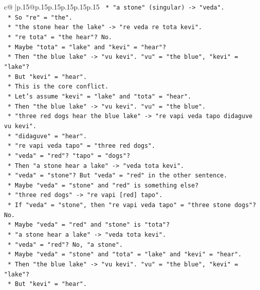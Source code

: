 \documentclass{article}
\begin{document}
{\begin{supertabular}{c@{$\;$}|p{.15\linewidth}@{}p{.15\linewidth}p{.15\linewidth}p{.15\linewidth}p{.15\linewidth}p{.15\linewidth}}
{{{\texttt{    *   "a stone" (singular) {-}> "veda".} \\
\texttt{    *   So "re" = "the".} \\
\texttt{    *   "the stone hear the lake" {-}> "re veda re tota kevi".} \\
\texttt{    *   "re tota" = "the hear"? No.} \\
\texttt{    *   Maybe "tota" = "lake" and "kevi" = "hear"?} \\
\texttt{    *   Then "the blue lake" {-}> "vu kevi". "vu" = "the blue", "kevi" = "lake"?} \\
\texttt{    *   But "kevi" = "hear".} \\
\texttt{    *   This is the core conflict.} \\
\texttt{    *   Let's assume "kevi" = "lake" and "tota" = "hear".} \\
\texttt{    *   Then "the blue lake" {-}> "vu kevi". "vu" = "the blue".} \\
\texttt{    *   "three red dogs hear the blue lake" {-}> "re vapi veda tapo didaguve vu kevi".} \\
\texttt{    *   "didaguve" = "hear".} \\
\texttt{    *   "re vapi veda tapo" = "three red dogs".} \\
\texttt{    *   "veda" = "red"? "tapo" = "dogs"?} \\
\texttt{    *   Then "a stone hear a lake" {-}> "veda tota kevi".} \\
\texttt{    *   "veda" = "stone"? But "veda" = "red" in the other sentence.} \\
\texttt{    *   Maybe "veda" = "stone" and "red" is something else?} \\
\texttt{    *   "three red dogs" {-}> "re vapi {[}red{]} tapo".} \\
\texttt{    *   If "veda" = "stone", then "re vapi veda tapo" = "three stone dogs"? No.} \\
\texttt{    *   Maybe "veda" = "red" and "stone" is "tota"?} \\
\texttt{    *   "a stone hear a lake" {-}> "veda tota kevi".} \\
\texttt{    *   "veda" = "red"? No, "a stone".} \\
\texttt{    *   Maybe "veda" = "stone" and "tota" = "lake" and "kevi" = "hear".} \\
\texttt{    *   Then "the blue lake" {-}> "vu kevi". "vu" = "the blue", "kevi" = "lake"?} \\
\texttt{    *   But "kevi" = "hear".} \\
}}}
\end{supertabular}}
\end{document}
